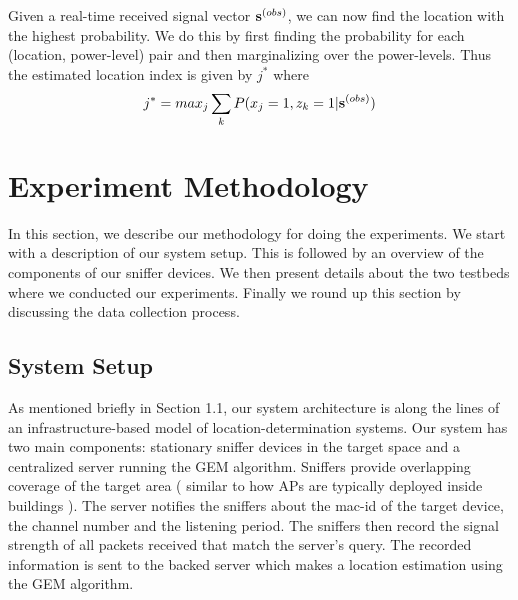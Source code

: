 \documentclass{Localization-PaperWriteupDraft}
\begin{document}
% 

Given a real-time received signal vector ${\bf {s}}^{(obs)}$, we can now find the location with the highest probability. We do this by first finding the probability for each (location, power-level) pair and then marginalizing over the power-levels. Thus the estimated location index is given by $j^{*}$ where
\begin{align}
j^{*} = max_{j} \sum_{k} P({x_{j}} = 1, {z_{k}} = 1 | {\bf {s}}^{(obs)}) 
\end{align}

\section{Experiment Methodology}
\label{sec:experimentmethodology}

In this section, we describe our methodology for doing the experiments. We start with a description of our system setup. This is followed by an overview of the components of our sniffer devices. We then present details about the two testbeds where we conducted our experiments. Finally we round up this section by discussing the data collection process.

\subsection{System Setup}
\label{subsec:systemsetup}

As mentioned briefly in Section 1.1, our system architecture is along the lines of an infrastructure-based model of location-determination systems. Our system has two main components: stationary sniffer devices in the target space and a centralized server running the GEM algorithm. Sniffers provide overlapping coverage of the target area ( similar to how APs are typically deployed inside buildings ). The server notifies the sniffers about the mac-id of the target device, the channel number and the listening period. The sniffers then record the signal strength of all packets received that match the server's query. The recorded information is sent to the backed server which makes a location estimation using the GEM algorithm.
\end{document}

